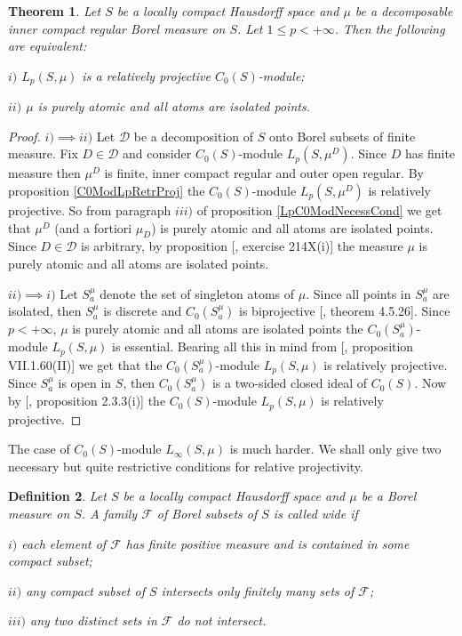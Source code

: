 \documentclass[12pt]{article}
\newtheorem{theorem}{Theorem}[section]
\newtheorem{definition}[theorem]{Definition}
\begin{document}
\begin{theorem}\label{ReflLpC0ModCrit} Let $S$ be a locally compact Hausdorff space and $\mu$ be a decomposable inner compact regular Borel measure on $S$. Let $1\leq p< +\infty$. Then the following are equivalent:

    $i)$ $L_p(S,\mu)$ is a relatively projective $C_0(S)$-module;

    $ii)$ $\mu$ is purely atomic and all atoms are isolated points.
\end{theorem}
\begin{proof} $i)\implies ii)$ Let $\mathcal{D}$ be a decomposition of $S$ onto Borel subsets of finite measure. Fix $D\in\mathcal{D}$ and consider $C_0(S)$-module $L_p(S,\mu^D)$. Since $D$ has finite measure then $\mu^D$ is finite, inner compact regular and outer open regular. By proposition \ref{C0ModLpRetrProj} the $C_0(S)$-module $L_p(S,\mu^D)$ is relatively projective. So from paragraph $iii)$ of proposition \ref{LpC0ModNecessCond} we get that $\mu^D$ (and a fortiori $\mu_D$) is purely atomic and all atoms are isolated points. Since $D\in\mathcal{D}$ is arbitrary, by proposition [\cite{FremMeasTh2}, exercise 214X(i)] the measure $\mu$ is purely atomic and all atoms are isolated points.

    $ii)\implies i)$ Let $S_a^\mu$ denote the set of singleton atoms of $\mu$. Since all points in $S_a^\mu$ are isolated, then $S_a^\mu$ is discrete and $C_0(S_a^\mu)$ is biprojective [\cite{HelHomolBanTopAlg}, theorem 4.5.26]. Since $p<+\infty$, $\mu$ is purely atomic and all atoms are isolated points the $C_0(S_a^\mu)$-module $L_p(S,\mu)$ is  essential. Bearing all this in mind from [\cite{HelBanLocConvAlg}, proposition VII.1.60(II)] we get that the $C_0(S_a^\mu)$-module $L_p(S,\mu)$ is relatively projective. Since $S_a^\mu$ is open in $S$, then $C_0(S_a^\mu)$ is a two-sided closed ideal of $C_0(S)$. Now by [\cite{RamsHomPropSemgroupAlg}, proposition 2.3.3(i)] the $C_0(S)$-module $L_p(S,\mu)$ is relatively projective.
\end{proof}

The case of $C_0(S)$-module $L_\infty(S,\mu)$ is much harder. We shall only give two necessary but quite restrictive conditions for relative projectivity.

\begin{definition}\label{WideFamilyDef} Let $S$ be a locally compact Hausdorff space and $\mu$ be a Borel measure on $S$. A family $\mathcal{F}$ of Borel subsets of $S$ is called wide if

    $i)$ each element of $\mathcal{F}$ has finite positive measure and is contained in some compact subset;

    $ii)$  any compact subset of $S$ intersects only finitely many sets of $\mathcal{F}$;

    $iii)$  any two distinct sets in $\mathcal{F}$ do not intersect.
\end{definition}
\end{document}
